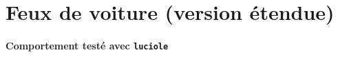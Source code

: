 \documentclass[a4paper, 11pt]{article}
\begin{document}
\section{Feux de voiture (version étendue)}
\paragraph{Comportement testé avec \texttt{luciole}}
\begin{center}
\end{center}
\end{document}
